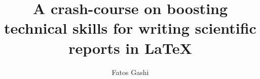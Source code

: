 \newenvironment{exampletwouptiny}
  {\VerbatimEnvironment
   \begin{VerbatimOut}{example.out}}
  {\end{VerbatimOut}
   \setlength{\parindent}{0pt}
   \fbox{\begin{tabular}{l|l}
   \begin{minipage}{0.55\linewidth}
     \inputminted[fontsize=\scriptsize,resetmargins]{latex}{example.out}
   \end{minipage} &
   \begin{minipage}{0.35\linewidth}
     \setlength{\parskip}{6pt plus 1pt minus 1pt}%
     \raggedright\scriptsize
   \end{minipage}
   \end{tabular}}}

\newenvironment{exampletwouptinynoframe}
  {\VerbatimEnvironment
   \begin{VerbatimOut}{example.out}}
  {\end{VerbatimOut}
   \setlength{\parindent}{0pt}
   \begin{tabular}{l|l}
   \begin{minipage}{0.55\linewidth}
     \inputminted[fontsize=\scriptsize,resetmargins]{latex}{example.out}
   \end{minipage} &
   \begin{minipage}{0.35\linewidth}
     \setlength{\parskip}{6pt plus 1pt minus 1pt}%
     \raggedright\scriptsize
   \end{minipage}
   \end{tabular}}





\title{A crash-course on boosting technical skills for writing scientific reports in \LaTeX}
\author{Fatos Gashi}

\titlegraphic{


}
% 
